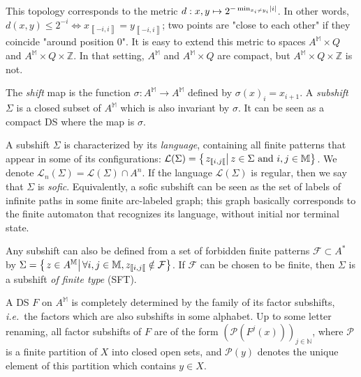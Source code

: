 \documentclass{llncs}
\newcommand{\M}{{\mathbb M}}
\newcommand{\am}{A^\M}
\newcommand{\Zset}{{\mathbb Z}}
\newcommand{\Nset}{{\mathbb N}}
\newcommand{\lang}{\mathcal L}
\newcommand{\et}{\textrm{ and }}
\newcommand{\xpr}[1]{"#1"}
\newcommand{\co}[2]{\left\llbracket #1,#2\right\llbracket}\newcommand{\cc}[2]{\left\llbracket #1,#2\right\rrbracket}\newcommand{\oo}[2]{\left\rrbracket #1,#2\right\llbracket}\newcommand{\oc}[2]{\left\rrbracket #1,#2\right\rrbracket}\newcommand{\ci}[1]{\co{#1}\infty}\newcommand{\io}[1]{\oo{-\infty}{#1}}\newcommand{\oi}[1]{\oo{#1}\infty}\newcommand{\ic}[1]{\oc{-\infty}{#1}}
\newcommand{\scc}[2]{_{\cc{#1}{#2}}}\newcommand{\sco}[2]{_{\co{#1}{#2}}}\newcommand{\soo}[2]{_{\oo{#1}{#2}}}\newcommand{\soc}[2]{_{\oc{#1}{#2}}}\newcommand{\sci}[1]{_{\ci{#1}}}\newcommand{\sio}[1]{_{\io{#1}}}\newcommand{\soi}[1]{_{\oi{#1}}}\newcommand{\sic}[1]{_{\ic{#1}}}
\newcommand{\sett}[2]{\left\{\left.#1\vphantom{#2}\right|#2\right\}}
\newcommand{\set}[3]{\sett{#1\in#2}{#3}}
\newcommand{\ie}{\textit{i.e.}\ }
\begin{document}
This topology corresponds to the metric $d:x,y\mapsto2^{-\min_{x_i\ne y_i}\left|i\right|}$.
In other words, $d(x,y)\le 2^{-i} \Leftrightarrow x\scc{-i}i=y\scc{-i}i$; two points are \xpr{close to each other} if they coincide \xpr{around position 0}.
It is easy to extend this metric to spaces $\am\times Q$ and $\am\times Q\times\Zset$.
In that setting, $\am$ and $\am\times Q$ are compact, but $\am\times Q\times\Zset$ is not.



The \emph{shift} map is the function $\sigma:\am\to\am$ defined by $\sigma(x)_i=x_{i+1}$.
A \emph{subshift} $\Sigma$ is a closed subset of $\am$ which is also invariant by $\sigma$. It can be seen as a compact DS where the map is $\sigma$.

A subshift $\Sigma$ is characterized by its \emph{language}, containing all finite patterns that appear in some of its configurations: $\lang(\Sigma)=\sett{z\sco ij}{z\in\Sigma\et i,j\in\M}$. We denote $\lang_n(\Sigma)=\lang(\Sigma)\cap A^n$.
If the language $\lang(\Sigma)$ is regular, then we say that $\Sigma$ is \emph{sofic}.
Equivalently, a sofic subshift can be seen as the set of labels of infinite paths in some finite arc-labeled graph; this graph basically corresponds to the finite automaton that recognizes its language, without initial nor terminal state.

Any subshift can also be defined from a set of forbidden finite patterns $\mathcal F\subset A^*$ by $\Sigma=\set z\am{\forall i,j\in\M,z\sco ij\notin\mathcal F}$.
If $\mathcal F$ can be chosen to be finite, then $\Sigma$ is a subshift \emph{of finite type} (SFT).

A DS $F$ on $\am$ is completely determined by the family of its factor subshifts, \ie the factors which are also subshifts in some alphabet.
Up to some letter renaming, all factor subshifts of $F$ are of the form $(\mathcal P(F^j(x)))_{j\in\Nset}$, where $\mathcal P$ is a finite partition of $X$ into closed open sets, and $\mathcal P(y)$ denotes the unique element of this partition which contains $y\in X$.
\end{document}
